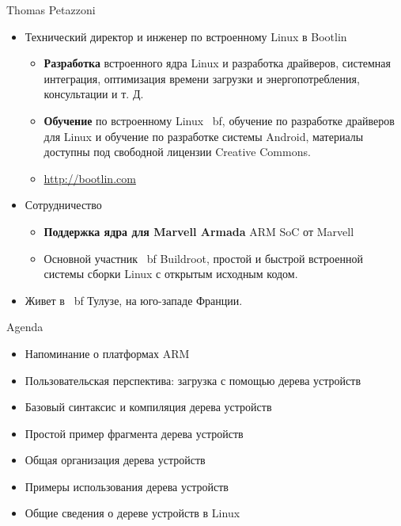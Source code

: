 \documentclass[obeyspaces,spaces,hyphens]{beamer}
\begin{document}
\begin{frame}{Thomas Petazzoni}
  \begin{itemize}
  \item Технический директор и инженер по встроенному Linux в Bootlin
    \begin{itemize}
    \item {\bf Разработка} встроенного ядра Linux и разработка драйверов, системная интеграция, оптимизация времени загрузки и энергопотребления, консультации и т. Д.
    \item {\bf Обучение} по встроенному Linux {\ bf}, обучение по разработке драйверов для Linux и обучение по разработке системы Android, материалы доступны под свободной лицензии Creative Commons.
    \item \url{http://bootlin.com}
    \end{itemize}
  \item Сотрудничество
    \begin{itemize}
    \item {\bf Поддержка ядра для Marvell Armada} ARM SoC от Marvell
    \item Основной участник {\ bf Buildroot}, простой и быстрой встроенной системы сборки Linux с открытым исходным кодом.
    \end{itemize}
  \item Живет в {\ bf Тулузе}, на юго-западе Франции.
  \end{itemize}
\end{frame}

\begin{frame}{Agenda}
  \begin{itemize}
  \item Напоминание о платформах ARM
   \item Пользовательская перспектива: загрузка с помощью дерева устройств
   \item Базовый синтаксис и компиляция дерева устройств
   \item Простой пример фрагмента дерева устройств
   \item Общая организация дерева устройств
   \item Примеры использования дерева устройств
   \item Общие сведения о дереве устройств в Linux
  \end{itemize}
\end{frame}
\end{document}
